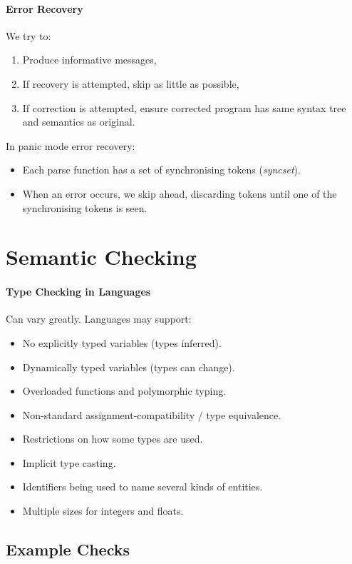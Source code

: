 \documentclass[twocolumn,english]{article}
\begin{document}
\paragraph{Error Recovery}

We try to:
\begin{enumerate}
\item Produce informative messages,
\item If recovery is attempted, skip as little as possible,
\item If correction is attempted, ensure corrected program has same syntax
tree and semantics as original.
\end{enumerate}
In panic mode error recovery:
\begin{itemize}
\item Each parse function has a set of synchronising tokens (\emph{syncset}).
\item When an error occurs, we skip ahead, discarding tokens until one of
the synchronising tokens is seen.
\end{itemize}

\section{Semantic Checking}

\paragraph{Type Checking in Languages}

Can vary greatly. Languages may support:
\begin{itemize}
\item No explicitly typed variables (types inferred).
\item Dynamically typed variables (types can change).
\item Overloaded functions and polymorphic typing.
\item Non-standard assignment-compatibility / type equivalence.
\item Restrictions on how some types are used.
\item Implicit type casting.
\item Identifiers being used to name several kinds of entities.
\item Multiple sizes for integers and floats.
\end{itemize}

\subsection{Example Checks}
\end{document}
